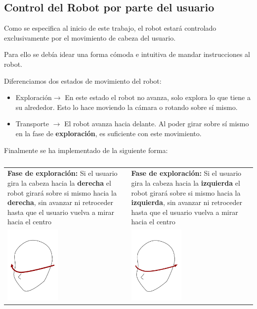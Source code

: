 \documentclass[twoside, 11pt]{epstfg}
\begin{document}
\subsection{Control del Robot por parte del usuario}

Como se especifica al inicio de este trabajo, el robot estará controlado exclusivamente por el movimiento de cabeza del usuario.

Para ello se debía idear una forma cómoda e intuitiva de mandar instrucciones al robot.

Diferenciamos dos estados de movimiento del robot:
\begin{itemize}
	\item Exploración$\rightarrow$ En este estado el robot no avanza, solo explora lo que tiene a su alrededor. Esto lo hace moviendo la cámara o rotando sobre sí mismo.
	\item Transporte $\rightarrow$ El robot avanza hacia delante. Al poder girar sobre sí mismo en la fase de \textbf{exploración}, es suficiente con este movimiento.
\end{itemize}

Finalmente se ha implementado de la siguiente forma:



\begin{table}[H]
	\begin{tabular}{p{7.0cm}  p{7.0cm}}
		\textbf{Fase de exploración:} Si el usuario gira la cabeza hacia la \textbf{derecha} el robot girará sobre si mismo hacia la \textbf{derecha}, sin avanzar ni retroceder hasta que el usuario vuelva a mirar hacia el centro & \textbf{Fase de exploración:} Si el usuario gira la cabeza hacia la \textbf{izquierda} el robot girará sobre si mismo hacia la \textbf{izquierda}, sin avanzar ni retroceder hasta que el usuario vuelva a mirar hacia el centro \\ 
		\centering\includegraphics[height=1.5in]{images/movder.png} & \centering\includegraphics[height=1.5in]{images/movderbuena.png} \\
		
	\end{tabular}
	\caption{}
	\label{movRobotRot}
\end{table}
\end{document}
